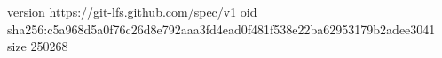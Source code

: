 version https://git-lfs.github.com/spec/v1
oid sha256:c5a968d5a0f76c26d8e792aaa3fd4ead0f481f538e22ba62953179b2adee3041
size 250268
